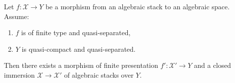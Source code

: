 %
\begin{lemma}
\label{lemma-finite-type-closed-in-finite-presentation}
Let $f : \mathcal{X} \to Y$ be a morphism from an algebraic stack
to an algebraic space. Assume:
\begin{enumerate}
\item $f$ is of finite type and quasi-separated,
\item $Y$ is quasi-compact and quasi-separated.
\end{enumerate}
Then there exists a morphism of finite presentation
$f' : \mathcal{X}' \to Y$ and a closed immersion
$\mathcal{X} \to \mathcal{X}'$ of
algebraic stacks over $Y$.
\end{lemma}

